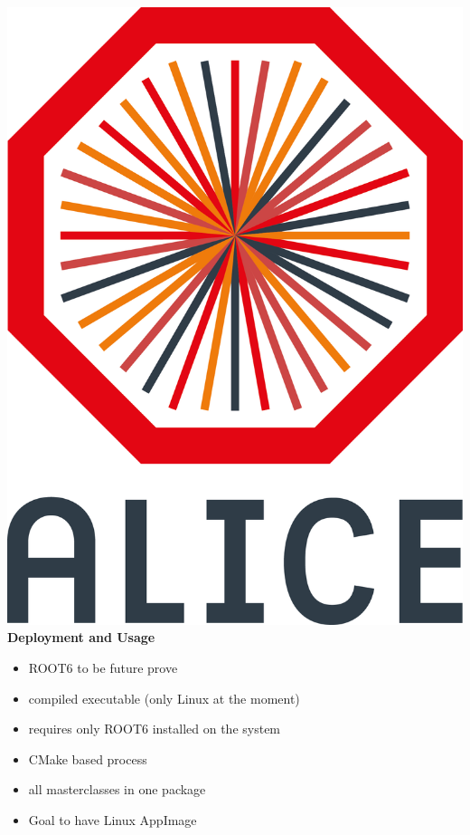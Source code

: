 \documentclass[aspectratio=1610,14pt,dvipsnames]{beamer}
\begin{document}
\begin{frame}{\includegraphics[height=0.07\textheight]{2012-Jul-04-4_Color_Logo_CB.png} \hspace{0.2cm}\textbf{Deployment and Usage}}
  \begin{itemize}
    \item<1-> ROOT6 to be future prove
    \item<2-> compiled executable (only Linux at the moment)
    \item<2-> requires only ROOT6 installed on the system
    \item<2-> CMake based process
    \item<3-> all masterclasses in one package
    \item<3-> Goal to have Linux AppImage
  \end{itemize}
\end{frame}
\end{document}
